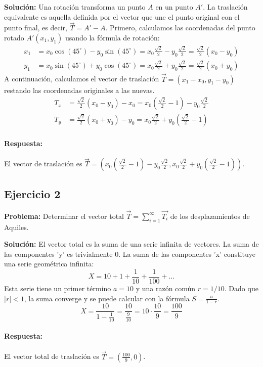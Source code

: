 \documentclass[12pt, letterpaper]{article}
\begin{document}
\textbf{Solución:} Una rotación transforma un punto $A$ en un punto $A'$. La traslación equivalente es aquella definida por el vector que une el punto original con el punto final, es decir, $\vec{T} = A' - A$.
Primero, calculamos las coordenadas del punto rotado $A'(x_1, y_1)$ usando la fórmula de rotación:
\begin{align*}
    x_1 &= x_0\cos(45^\circ) - y_0\sin(45^\circ) = x_0\frac{\sqrt{2}}{2} - y_0\frac{\sqrt{2}}{2} = \frac{\sqrt{2}}{2}(x_0 - y_0) \\
    y_1 &= x_0\sin(45^\circ) + y_0\cos(45^\circ) = x_0\frac{\sqrt{2}}{2} + y_0\frac{\sqrt{2}}{2} = \frac{\sqrt{2}}{2}(x_0 + y_0)
\end{align*}
A continuación, calculamos el vector de traslación $\vec{T} = (x_1 - x_0, y_1 - y_0)$ restando las coordenadas originales a las nuevas.
\begin{align*}
    T_x &= \frac{\sqrt{2}}{2}(x_0 - y_0) - x_0 = x_0\left(\frac{\sqrt{2}}{2}-1\right) - y_0\frac{\sqrt{2}}{2} \\
    T_y &= \frac{\sqrt{2}}{2}(x_0 + y_0) - y_0 = x_0\frac{\sqrt{2}}{2} + y_0\left(\frac{\sqrt{2}}{2}-1\right)
\end{align*}
\paragraph{Respuesta:} El vector de traslación es $\vec{T} = \left(x_0\left(\frac{\sqrt{2}}{2}-1\right) - y_0\frac{\sqrt{2}}{2}, x_0\frac{\sqrt{2}}{2} + y_0\left(\frac{\sqrt{2}}{2}-1\right)\right)$.

\subsection{Ejercicio 2}
\textbf{Problema:} Determinar el vector total $\vec{T} = \sum_{i=1}^{\infty} \vec{T_i}$ de los desplazamientos de Aquiles.

\textbf{Solución:} El vector total es la suma de una serie infinita de vectores. La suma de las componentes 'y' es trivialmente 0. La suma de las componentes 'x' constituye una serie geométrica infinita:
\[ X = 10 + 1 + \frac{1}{10} + \frac{1}{100} + \dots \]
Esta serie tiene un primer término $a=10$ y una razón común $r=1/10$. Dado que $|r| < 1$, la suma converge y se puede calcular con la fórmula $S = \frac{a}{1 - r}$.
\[ X = \frac{10}{1 - \frac{1}{10}} = \frac{10}{\frac{9}{10}} = 10 \cdot \frac{10}{9} = \frac{100}{9} \]
\paragraph{Respuesta:} El vector total de traslación es $\vec{T} = \left(\frac{100}{9}, 0\right)$.
\end{document}
